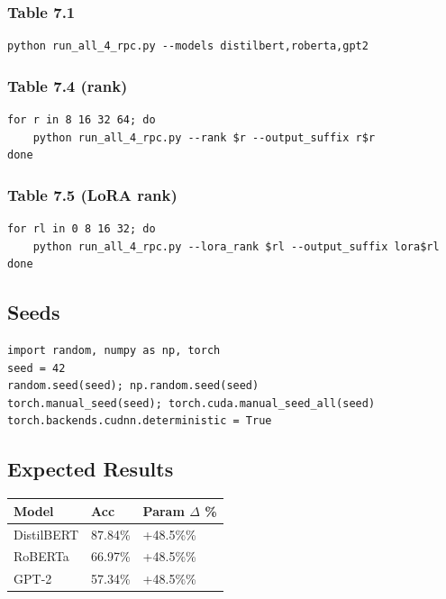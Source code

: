 \subsubsection{Table 7.1}
\begin{lstlisting}
python run_all_4_rpc.py --models distilbert,roberta,gpt2
\end{lstlisting}

\subsubsection{Table 7.4 (rank)}
\begin{lstlisting}
for r in 8 16 32 64; do
    python run_all_4_rpc.py --rank $r --output_suffix r$r
done
\end{lstlisting}

\subsubsection{Table 7.5 (LoRA rank)}
\begin{lstlisting}
for rl in 0 8 16 32; do
    python run_all_4_rpc.py --lora_rank $rl --output_suffix lora$rl
done
\end{lstlisting}

\subsection{Seeds}

\begin{lstlisting}
import random, numpy as np, torch
seed = 42
random.seed(seed); np.random.seed(seed)
torch.manual_seed(seed); torch.cuda.manual_seed_all(seed)
torch.backends.cudnn.deterministic = True
\end{lstlisting}

\subsection{Expected Results}

\begin{table}[H]
\centering
\small
\begin{tabular}{lll}
\toprule
\textbf{Model} & \textbf{Acc} & \textbf{Param $\Delta$ \%} \\
\midrule
DistilBERT & 87.84\% & +48.5\%\% \\
RoBERTa & 66.97\% & +48.5\%\% \\
GPT-2 & 57.34\% & +48.5\%\% \\
\bottomrule
\end{tabular}
\end{table}

